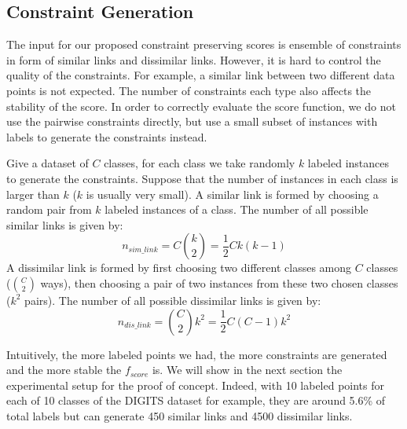 \subsection{Constraint Generation}\label{sec:xp:constraint}

The input for our proposed constraint preserving scores is ensemble of constraints in form of similar links and dissimilar links.
However, it is hard to control the quality of the constraints.
For example, a similar link between two different data points is not expected.
The number of constraints each type also affects the stability of the score.
In order to correctly evaluate the score function, we do not use the pairwise constraints directly, but use a small subset of instances with labels to generate the constraints instead.

Give a dataset of $C$ classes, for each class we take randomly $k$ labeled instances to generate the constraints.
Suppose that the number of instances in each class is larger than $k$ ($k$ is usually very small).
A similar link is formed by choosing a random pair from $k$ labeled instances of a class.
The number of all possible similar links is given by:
\begin{equation}\label{equ:n-sim-link}
n_{sim\_link} = C {k \choose 2} = \frac{1}{2} C k (k-1)
\end{equation}
A dissimilar link is formed by first choosing two different classes among $C$ classes (${C \choose 2}$ ways),
then choosing a pair of two instances from these two chosen classes ($k^2$ pairs).
The number of all possible dissimilar links is given by:
\begin{equation}\label{equ:n-dis-link}
n_{dis\_link} = {C \choose 2} k^2 = \frac{1}{2} C (C-1) k^2
\end{equation}

Intuitively, the more labeled points we had, the more constraints are generated and the more stable the $f_{score}$ is.
We will show in the next section the experimental setup for the proof of concept.
Indeed, with 10 labeled points for each of 10 classes of the DIGITS dataset for example, they are around 5.6\% of total labels but can generate 450 similar links and 4500 dissimilar links.

